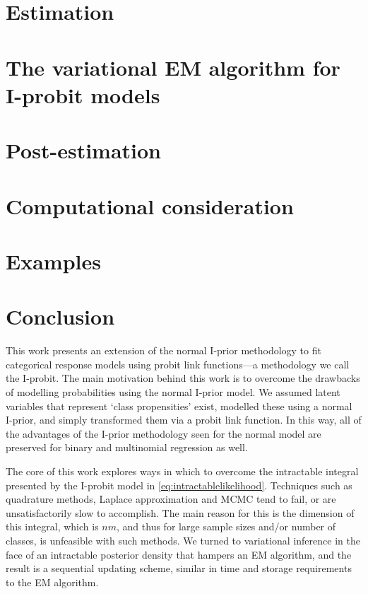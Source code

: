 \documentclass[a4paper,showframe,11pt]{report}
\begin{document}
\section{Estimation}


\section{The variational EM algorithm for I-probit models}\label{sec:iprobitvar}


\section{Post-estimation}
%

\section{Computational consideration}
%

\section{Examples}
\label{sec:iprobiteg}
%

\section{Conclusion}

This work presents an extension of the normal I-prior methodology to fit categorical response models using probit link functions---a methodology we call the I-probit.
The main motivation behind this work is to overcome the drawbacks of modelling probabilities using the normal I-prior model.
We assumed latent variables that represent `class propensities' exist, modelled these using a normal I-prior, and simply transformed them via a probit link function.
In this way, all of the advantages of the I-prior methodology seen for the normal model are preserved for binary and multinomial regression as well.

The core of this work explores ways in which to overcome the intractable integral presented by the I-probit model in \cref{eq:intractablelikelihood}.
Techniques such as quadrature methods, Laplace approximation and MCMC tend to fail, or are unsatisfactorily slow to accomplish.
The main reason for this is the dimension of this integral, which is $nm$, and thus for large sample sizes and/or number of classes, is unfeasible with such methods.
We turned to variational inference in the face of an intractable posterior density that hampers an EM algorithm, and the result is a sequential updating scheme, similar in time and storage requirements to the EM algorithm.
\end{document}
